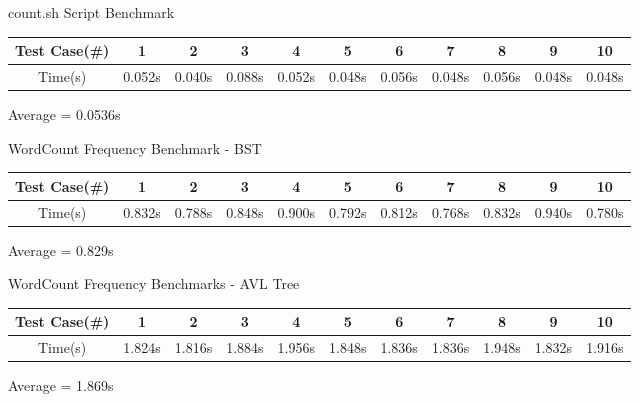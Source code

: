 \documentclass[12pt, oneside, letter]{article}
\newcommand{\env}[2]{
    \begin{#1}
        #2
    \end{#1}
}
\begin{document}
    \env{center} {
        count.sh Script Benchmark

        \vspace*{0.1in}

        \begin{tabular}{|c|c|c|c|c|c|c|c|c|c|c|}
            \hline
            Test Case(\#) & 1      & 2      & 3      & 4      & 5      & 6      & 7      & 8      & 9      & 10 \\
            \hline
            Time(s)       & 0.052s & 0.040s & 0.088s & 0.052s & 0.048s & 0.056s & 0.048s & 0.056s & 0.048s & 0.048s \\
            \hline
        \end{tabular}

        \vspace*{0.1in}

        Average = 0.0536s
    }

    \env{center} {
        WordCount Frequency Benchmark - BST

        \vspace*{0.1in}

        \begin{tabular}{|c|c|c|c|c|c|c|c|c|c|c|}
            \hline
            Test Case(\#) & 1      & 2      & 3      & 4      & 5      & 6      & 7      & 8      & 9      & 10 \\
            \hline
            Time(s)       & 0.832s & 0.788s & 0.848s & 0.900s & 0.792s & 0.812s & 0.768s & 0.832s & 0.940s & 0.780s \\
            \hline
        \end{tabular}

        \vspace*{0.1in}

        Average = 0.829s
    }

    \env{center} {
        WordCount Frequency Benchmarks - AVL Tree

        \vspace*{0.1in}

        \begin{tabular}{|c|c|c|c|c|c|c|c|c|c|c|}
            \hline
            Test Case(\#) & 1      & 2      & 3      & 4      & 5      & 6      & 7      & 8      & 9      & 10 \\
            \hline
            Time(s)       & 1.824s & 1.816s & 1.884s & 1.956s & 1.848s & 1.836s & 1.836s & 1.948s & 1.832s & 1.916s \\
            \hline
        \end{tabular}

        \vspace*{0.1in}

        Average = 1.869s
    }
    
\end{document}
